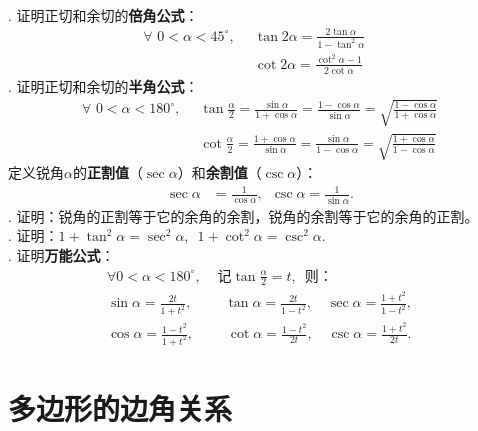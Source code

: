 \documentclass[12pt,UTF8]{ctexbook}
\begin{document}
\begin{xt}\label{xt:2-5-10}
    \mbox{} \\
    . 证明正切和余切的\textbf{倍角公式}：
    \begin{align*}
        \forall \,\, 0 < \alpha < 45^\circ, \,\,\,& \tan 2\alpha = \frac{2\tan \alpha}{1 - \tan^2 \alpha} &  \\
        &\cot 2\alpha = \frac{\cot^2 \alpha - 1}{2 \cot \alpha} &  
    \end{align*}
    . 证明正切和余切的\textbf{半角公式}：
    \begin{align*}
        \forall \,\, 0 < \alpha < 180^\circ, \,\,\,& \tan \frac{\alpha}{2} = \frac{\sin \alpha}{1 + \cos \alpha} = \frac{1 - \cos \alpha}{\sin \alpha} = \sqrt{\frac{1 - \cos \alpha}{1 + \cos \alpha}} \\
        & \cot \frac{\alpha}{2} = \frac{1 + \cos \alpha}{\sin \alpha} = \frac{\sin \alpha}{1 - \cos \alpha} = \sqrt{\frac{1 + \cos \alpha}{1 - \cos \alpha}}  
    \end{align*}
    定义锐角$\alpha$的\textbf{正割值}（$\sec \alpha$）和\textbf{余割值}（$\csc \alpha$）：
    \begin{align*}
        \sec \alpha &= \frac{1}{\cos \alpha}, \,\,\, \csc \alpha = \frac{1}{\sin \alpha}.  
    \end{align*}
    . 证明：锐角的正割等于它的余角的余割，锐角的余割等于它的余角的正割。\\
    . 证明：$ 1 + \tan^2 \alpha = \sec^2 \alpha , \,\,\, 1 + \cot^2 \alpha = \csc^2 \alpha. $\\
    . 证明\textbf{万能公式}：
    \begin{align*}
        \forall 0 < \alpha < 180^\circ, & \mbox{ 记} \tan\frac{\alpha}{2} = t, \,\,\, \mbox{则：} \\
        \sin \alpha = \frac{2t}{1 + t^2}, & \,\,\,\,\, \tan \alpha = \frac{2t}{1 - t^2}, \,\,\,\,\,\, \sec \alpha = \frac{1 + t^2}{1 -t^2},  \\
        \cos \alpha = \frac{1 -t^2}{1 + t^2}, & \,\,\,\,\,\, \cot \alpha = \frac{1 - t^2}{2t}, \,\,\,\,\,\, \csc \alpha = \frac{1 + t^2}{2t}.   
    \end{align*}
\end{xt}

\section{多边形的边角关系}
\end{document}
